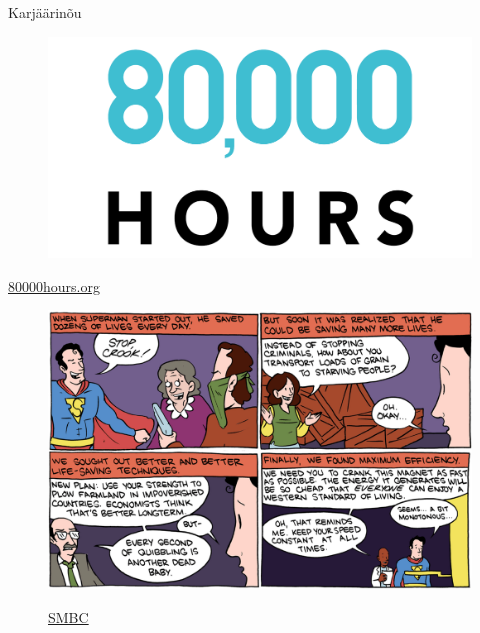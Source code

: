 \documentclass{beamer}
\begin{document}
\begin{frame}{Karjäärinõu}

  \begin{figure}[h]
    \centering
    \includegraphics[width=\textwidth]{80000hours_logo-transparent.png}
  \end{figure}

  \begin{center}
    \href{https://80000hours.org/}{80000hours.org}
  \end{center}

\end{frame}

\begin{frame}[plain]

  \begin{figure}[h]
    \centering
    \includegraphics[width=\textwidth]{superman.png}
    
    \href{http://www.smbc-comics.com/?id=2305}{SMBC}
  \end{figure}

\end{frame}
\end{document}
